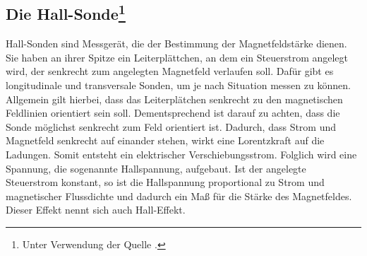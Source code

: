 \subsection[Hall-Sonde]{Die Hall-Sonde\footnote{Unter Verwendung der Quelle \cite{man:v308}.}}
Hall-Sonden sind Messgerät, die der Bestimmung der Magnetfeldstärke dienen.
Sie haben an ihrer Spitze ein Leiterplättchen, an dem ein Steuerstrom angelegt wird,
der senkrecht zum angelegten Magnetfeld verlaufen soll.
Dafür gibt es longitudinale und transversale Sonden, um je nach Situation messen zu können.
Allgemein gilt hierbei, dass das Leiterplätchen senkrecht zu den magnetischen Feldlinien orientiert sein soll.
Dementsprechend ist darauf zu achten, dass die Sonde möglichst senkrecht zum Feld orientiert ist.
Dadurch, dass Strom und Magnetfeld senkrecht auf einander stehen, wirkt eine Lorentzkraft auf die Ladungen.
Somit entsteht ein elektrischer Verschiebungsstrom.
Folglich wird eine Spannung, die sogenannte Hallspannung, aufgebaut.
Ist der angelegte Steuerstrom konstant, so ist die Hallspannung proportional zu Strom und magnetischer Flussdichte und
dadurch ein Maß für die Stärke des Magnetfeldes.
Dieser Effekt nennt sich auch Hall-Effekt.

